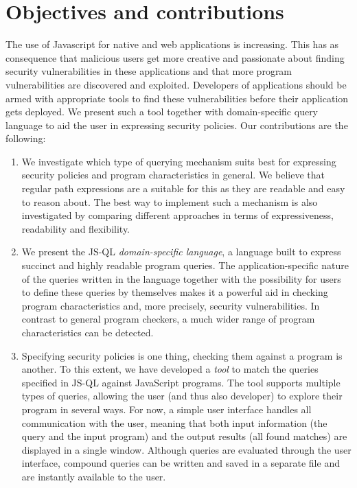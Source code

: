 \section{Objectives and contributions}
The use of Javascript for native and web applications is increasing. This has as consequence that malicious users get more creative and passionate about finding security vulnerabilities in these applications and that more program vulnerabilities are discovered and exploited. Developers of applications should be armed with appropriate tools to find these vulnerabilities before their application gets deployed. We present such a tool together with domain-specific query language to aid the user in expressing security policies. Our contributions are the following:
\begin{enumerate}
\item We investigate which type of querying mechanism suits best for expressing security policies and program characteristics in general. We believe that regular path expressions are a suitable for this as they are readable and easy to reason about. The best way to implement such a mechanism is also investigated by comparing different approaches in terms of expressiveness, readability and flexibility.
\item We present the JS-QL \textit{domain-specific language}, a language built to express succinct and highly readable program queries. The application-specific nature of the queries written in the language together with the possibility for users to define these queries by themselves makes it a powerful aid in checking program characteristics and, more precisely, security vulnerabilities. In contrast to general program checkers, a much wider range of program characteristics can be detected.
\item Specifying security policies is one thing, checking them against a program is another. To this extent, we have developed a \textit{tool} to match the queries specified in JS-QL against JavaScript programs. The tool supports multiple types of queries, allowing the user (and thus also developer) to explore their program in several ways. For now, a simple user interface handles all communication with the user, meaning that both input information (the query and the input program) and the output results (all found matches) are displayed in a single window. Although queries are evaluated through the user interface, compound queries can be written and saved in a separate file and are instantly available to the user.
\end{enumerate} 
